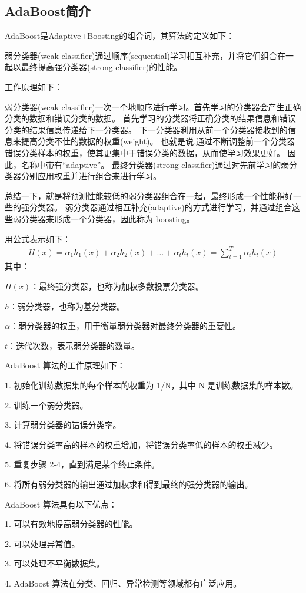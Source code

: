 \subsection{AdaBoost简介}

AdaBoost是Adaptive+Boosting的组合词，其算法的定义如下： \par
弱分类器(weak classifier)通过顺序(sequential)学习相互补充，并将它们组合在一起以最终提高强分类器(strong classifier)的性能。 \par

工作原理如下：\par
弱分类器(weak classifier)一次一个地顺序进行学习。首先学习的分类器会产生正确分类的数据和错误分类的数据。
首先学习的分类器将正确分类的结果信息和错误分类的结果信息传递给下一分类器。
下一分类器利用从前一个分类器接收到的信息来提高分类不佳的数据的权重(weight)。
也就是说,通过不断调整前一个分类器错误分类样本的权重，使其更集中于错误分类的数据，从而使学习效果更好。
因此，名称中带有“adaptive”。
最终分类器(strong classifier)通过对先前学习的弱分类器分别应用权重并进行组合来进行学习。 \par

总结一下，就是将预测性能较低的弱分类器组合在一起，最终形成一个性能稍好一些的强分类器。
弱分类器通过相互补充(adaptive)的方式进行学习，并通过组合这些弱分类器来形成一个分类器，因此称为 boosting。 \par

用公式表示如下：
\begin{gather}
    H(x) = \alpha_1 h_1(x) + \alpha_2 h_2(x) + \dots + \alpha_t h_t(x) = \sum_{t = 1}^{T} \alpha_t h_t(x)
\end{gather}
其中：\par
$H(x)$：最终强分类器，也称为加权多数投票分类器。 \par
$h$：弱分类器，也称为基分类器。 \par
$\alpha$：弱分类器的权重，用于衡量弱分类器对最终分类器的重要性。 \par
$t$：迭代次数，表示弱分类器的数量。 \par

\noindent AdaBoost 算法的工作原理如下： \par
1. 初始化训练数据集的每个样本的权重为 1/N，其中 N 是训练数据集的样本数。\par
2. 训练一个弱分类器。\par
3. 计算弱分类器的错误分类率。\par
4. 将错误分类率高的样本的权重增加，将错误分类率低的样本的权重减少。\par
5. 重复步骤 2-4，直到满足某个终止条件。\par
6. 将所有弱分类器的输出通过加权求和得到最终的强分类器的输出。\par


\noindent AdaBoost 算法具有以下优点：\par
1. 可以有效地提高弱分类器的性能。\par
2. 可以处理异常值。\par
3. 可以处理不平衡数据集。\par
4. AdaBoost 算法在分类、回归、异常检测等领域都有广泛应用。\par